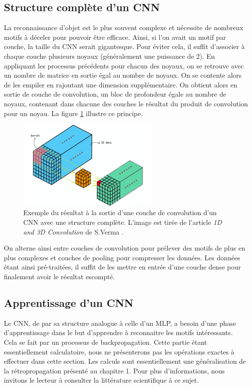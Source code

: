 \subsection{Structure complète d'un CNN}

La reconnaissance d'objet est le plus souvent complexe et nécessite de nombreux motifs à déceler pour pouvoir être efficace. Ainsi, si l'on avait un motif par couche, la taille du CNN serait gigantesque. Pour éviter cela, il suffit d'associer à chaque couche plusieurs noyaux (généralement une puissance de 2). En appliquant les processus précédents pour chacun des noyaux, on se retrouve avec un nombre de matrice en sortie égal au nombre de noyaux. On se contente alors de les empiler en rajoutant une dimension supplémentaire. On obtient alors en sortie de couche de convolution, un bloc de profondeur égale au nombre de noyaux, contenant dans chacune des couches le résultat du produit de convolution pour un noyau. La figure \ref{structure_CNN_2} illustre ce principe.

\begin{figure}[!h]
\centering
\includegraphics[width=200pt]{images/cnn/structure_CNN_2.png}
\caption{Exemple du résultat à la sortie d'une couche de convolution d'un CNN avec une structure complète. L'image est tirée de l'article \textit{1D and 3D Convolution} de S.Verma \cite{verma_understanding_2020}.}
\label{structure_CNN_2}
\end{figure}

On alterne ainsi entre couches de convolution pour prélever des motifs de plus en plus complexes et couches de pooling pour compresser les données. Les données étant ainsi pré-traitées, il suffit de les mettre en entrée d'une couche dense pour finalement avoir le résultat escompté.

\subsection{Apprentissage d'un CNN}

Le CNN, de par sa structure analogue à celle d'un MLP, a besoin d'une phase d'apprentissage dans le but d'apprendre à reconnaitre les motifs intéressants. Cela se fait par un processus de backpropagation. Cette partie étant essentiellement calculatoire, nous ne présenterons pas les opérations exactes à effectuer dans cette section. Les calculs sont essentiellement une généralisation de la rétropropagation présenté au chapitre 1. Pour plus d'informations, nous invitons le lecteur à consulter la littérature scientifique à ce sujet.
 
